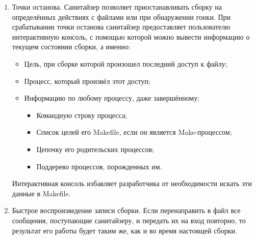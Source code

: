 \begin{enumerate}
    \item Точки останова. Санитайзер позволяет приостанавливать сборку на определённых действиях с файлами или при обнаружении гонки. При срабатывании точки останова санитайзер предоставляет пользователю интерактивную консоль, с помощью которой можно вывести информацию о текущем состоянии сборки, а именно:

    \begin{itemize}
        \item Цель, при сборке которой произошел последний доступ к файлу;
        \item Процесс, который произвёл этот доступ;
        \item Информацию по любому процессу, даже завершённому:
        \begin{itemize}
            \item Командную строку процесса;
            \item Список целей его Makefile, если он является Make-процессом;
            \item Цепочку его родительских процессов;
            \item Поддерево процессов, порожденных им.
        \end{itemize}
    \end{itemize}

    Интерактивная консоль избавляет разработчика от необходимости искать эти данные в Makefile.

    \item Быстрое воспроизведение записи сборки. Если перенаправить в файл все сообщения, поступающие санитайзеру, и передать их на вход повторно, то результат его работы будет таким же, как и во время настоящей сборки.

    \begin{figure}[H]
        \centering
\end{figure}
\end{enumerate}
